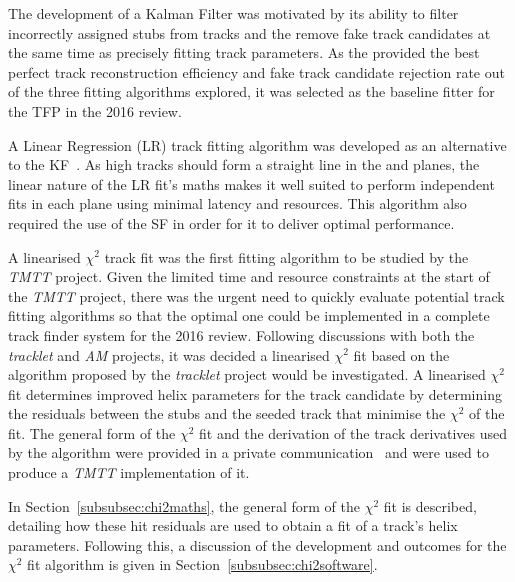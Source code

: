 The development of a Kalman Filter was motivated by its ability to filter incorrectly assigned stubs from tracks and the remove fake track candidates at the same time as precisely fitting track parameters.
As the \KF provided the best perfect track reconstruction efficiency and fake track candidate rejection rate out of the three fitting algorithms explored, it was selected as the baseline fitter for the TFP in the 2016 review.

A Linear Regression (LR) track fitting algorithm was developed as an alternative to the KF~\cite{TMTT_FLP}.
As high \pT tracks should form a straight line in the \emph{\rphi} and \emph{\rz} planes, the linear nature of the LR fit's maths makes it well suited to perform independent fits in each plane using minimal latency and resources.
This algorithm also required the use of the SF in order for it to deliver optimal performance.

A linearised $\chi^{2}$ track fit was the first fitting algorithm to be studied by the \emph{TMTT} project.
Given the limited time and resource constraints at the start of the \emph{TMTT} project, there was the urgent need to quickly evaluate potential track fitting algorithms so that the optimal one could be implemented in a complete track finder system for the 2016 review.
Following discussions with both the \emph{tracklet} and \emph{AM} projects, it was decided a linearised $\chi^{2}$ fit based on the algorithm proposed by the \emph{tracklet} project would be investigated.
A linearised $\chi^{2}$ fit determines improved helix parameters for the track candidate by determining the  residuals between the stubs and the seeded track that minimise the $\chi^{2}$ of the fit.
The general form of the $\chi^{2}$ fit and the derivation of the track derivatives used by the algorithm were provided in a private communication~\cite{CMS_DN-14-043} and were used to produce a \emph{TMTT} implementation of it.


In Section~\ref{subsubsec:chi2maths}, the general form of the $\chi^{2}$ fit is described, detailing how these hit residuals are used to obtain a fit of a track's helix parameters.
Following this, a discussion of the development and outcomes for the $\chi^{2}$ fit algorithm is given in Section~\ref{subsubsec:chi2software}.


